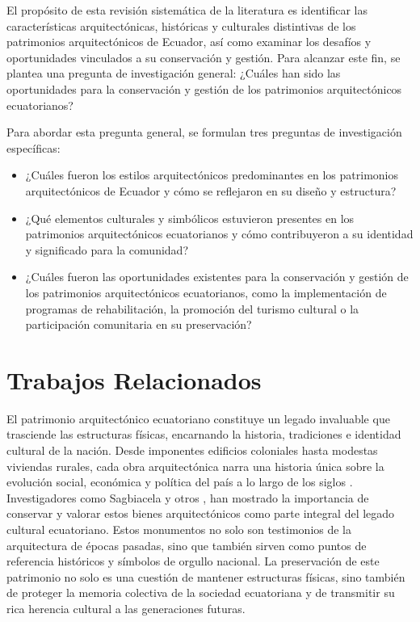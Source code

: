 \documentclass[journal,article,submit,pdftex,moreauthors]{Definitions/mdpi}
\begin{document}
El propósito de esta revisión sistemática de la literatura es identificar las características arquitectónicas, históricas y culturales distintivas de los patrimonios arquitectónicos de Ecuador, así como examinar los desafíos y oportunidades vinculados a su conservación y gestión. Para alcanzar este fin, se plantea una pregunta de investigación general: ¿Cuáles han sido las oportunidades para la conservación y gestión de los patrimonios arquitectónicos ecuatorianos?
\par %
Para abordar esta pregunta general, se formulan tres preguntas de investigación específicas: 
\begin{itemize}
\item ¿Cuáles fueron los estilos arquitectónicos predominantes en los patrimonios arquitectónicos de Ecuador y cómo se reflejaron en su diseño y estructura?
\item ¿Qué elementos culturales y simbólicos estuvieron presentes en los patrimonios arquitectónicos ecuatorianos y cómo contribuyeron a su identidad y significado para la comunidad?
\item ¿Cuáles fueron las oportunidades existentes para la conservación y gestión de los patrimonios arquitectónicos ecuatorianos, como la implementación de programas de rehabilitación, la promoción del turismo cultural o la participación comunitaria en su preservación?
\end{itemize}

\section{Trabajos Relacionados}
El patrimonio arquitectónico ecuatoriano constituye un legado invaluable que trasciende las estructuras físicas, encarnando la historia, tradiciones e identidad cultural de la nación. Desde imponentes edificios coloniales hasta modestas viviendas rurales, cada obra arquitectónica narra una historia única sobre la evolución social, económica y política del país a lo largo de los siglos \cite{art:articulo9}.  Investigadores como Sagbiacela y otros \cite{art:articulo10}, han mostrado la importancia de conservar y valorar estos bienes arquitectónicos como parte integral del legado cultural ecuatoriano. Estos monumentos no solo son testimonios de la arquitectura de épocas pasadas, sino que también sirven como puntos de referencia históricos y símbolos de orgullo nacional. La preservación de este patrimonio no solo es una cuestión de mantener estructuras físicas, sino también de proteger la memoria colectiva de la sociedad ecuatoriana y de transmitir su rica herencia cultural a las generaciones futuras. 
\end{document}
